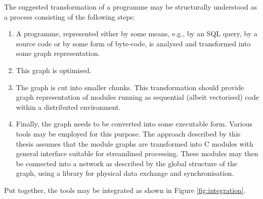 
The suggested transformation of a programme may be structurally understood as a process consisting of the following steps:

\begin{enumerate}
  \item A programme, represented either by some means, e.g., by an SQL query, by a source code or by some form of byte-code, is analysed and transformed into some graph representation. 
  \item This graph is optimised.
  \item The graph is cut into smaller chunks. This transformation should provide graph representation of modules running as sequential (albeit vectorised) code within a distributed environment.
  \item Finally, the graph needs to be converted into some executable form. Various tools may be employed for this purpose. The approach described by this thesis assumes that the module graphs are transformed into C modules with general interface suitable for streamlined processing. These modules may then be connected into a network as described by the global structure of the graph, using a library for physical data exchange and synchronisation.
\end{enumerate}


Put together, the tools may be integrated as shown in Figure \ref{fig:integration}.


